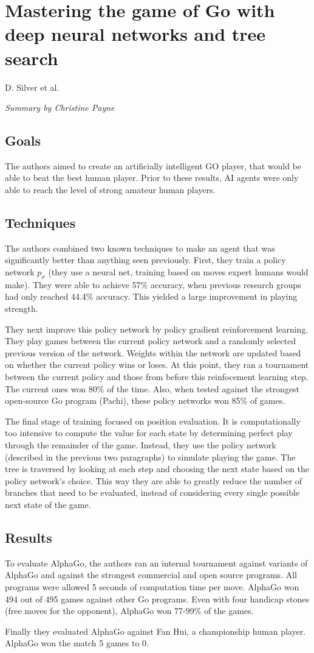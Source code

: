\documentclass[a4paper,12pt]{article}
\begin{document}
\section*{Mastering the game of Go with deep neural networks and tree search}
D. Silver et al.

\textit{Summary by Christine Payne}

\subsection*{Goals}
The authors aimed to create an artificially intelligent GO player, that would be able to beat the best human player. Prior to these results, AI agents were only able to reach the level of strong amateur human players.  
\subsection*{Techniques}
The authors combined two known techniques to make an agent that was significantly better than anything seen previously.  First, they train a policy network \(p_\sigma\) (they use a neural net, training based on moves expert humans would make). They were able to achieve 57\% accuracy, when previous research groups had only reached 44.4\% accuracy. This yielded a large improvement in playing strength.

They next improve this policy network by policy gradient reinforcement learning. They play games between the current policy network and a randomly selected previous version of the network. Weights within the network are updated based on whether the current policy wins or loses.  At this point, they ran a tournament between the current policy and those from before this reinfocement learning step. The current ones won 80\% of the time. Also, when tested against the strongest open-source Go program (Pachi), these policy networks won 85\% of games.

The final stage of training focused on position evaluation. It is computationally too intensive to compute the value
for each state by determining perfect play through the remainder of the game.  Instead, they use the policy network (described in the previous two paragraphs) to simulate playing the game. The tree is traversed by looking at each
step and choosing the next state based on the policy network's choice. This way they are able to greatly reduce the number
of branches that need to be evaluated, instead of considering every single possible next state of the game.


\subsection*{Results}

To evaluate AlphaGo, the authors ran an internal tournament against variants of AlphaGo and against the strongest commercial and open source programs.  All programs were allowed 5 seconds of computation time per move.  AlphaGo won 494 out of 495 games against other Go programs. Even with four handicap stones (free moves for the opponent), AlphaGo won 77-99\% of the games.

Finally they evaluated AlphaGo against Fan Hui, a championship human player. AlphaGo won the match 5 games to 0.
\end{document}
